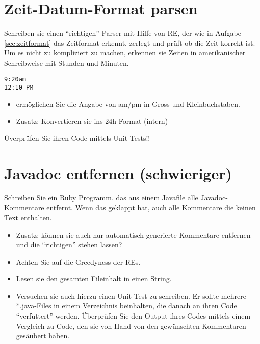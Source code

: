 \documentclass[a4paper,11pt,oneside]{scrbook}
\begin{document}


\section{Zeit-Datum-Format parsen} %
\label{sec:zeit_datum_format_parsen}
Schreiben sie einen “richtigen” Parser mit Hilfe von RE, der wie in Aufgabe \ref{sec:zeitformat} das Zeitformat erkennt, zerlegt und prüft ob die Zeit korrekt ist. Um es nicht zu kompliziert zu machen, erkennen sie Zeiten in amerikanischer Schreibweise mit Stunden und Minuten.

\begin{lstlisting}
9:20am
12:10 PM
\end{lstlisting}

\begin{itemize}
	\item ermöglichen Sie die Angabe von am/pm in Gross und Kleinbuchstaben.
	\item Zusatz: Konvertieren sie ins 24h-Format (intern)
\end{itemize}

Üverprüfen Sie ihren Code mittels Unit-Tests!!

\section{Javadoc entfernen (schwieriger)} %
\label{sec:javadoc_entfernen}
Schreiben Sie ein Ruby Programm, das aus einem Javafile alle Javadoc-Kommentare entfernt. Wenn das geklappt hat, auch alle Kommentare die keinen Text enthalten.
\begin{itemize}
	\item Zusatz: können sie auch nur automatisch generierte Kommentare entfernen und die “richtigen” stehen lassen?
	\item Achten Sie auf die Greedyness der REs.
	\item Lesen sie den gesamten Fileinhalt in einen String.
	\item Versuchen sie auch hierzu einen Unit-Test zu schreiben. Er sollte mehrere *.java-Files in einem Verzeichnis beinhalten, die danach an ihren Code “verfüttert” werden. Überprüfen Sie den Output ihres Codes mittels einem Vergleich zu Code, den sie von Hand von den gewünschten Kommentaren gesäubert haben.
\end{itemize}



\end{document}
